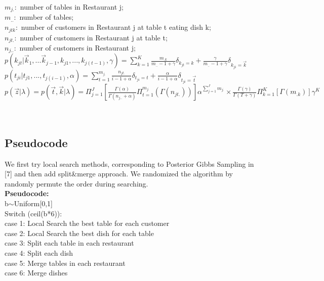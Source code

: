 \documentclass{article}
\begin{document}
$m_{j.}:$ number of tables in Restaurant j;\\
$m_{..}:$ number of tables;\\
$n_{jtk}:$ number of customers in Restaurant j at table t eating dish k;\\
$n_{jt.}:$ number of customers in Restaurant j at table t;\\
$n_{j..}:$ number of customers in Restaurant j;\\
$p(k_{jt}|\vec k_{1},...\vec k_{j-1},k_{j1},...,k_{j(t-1)},\gamma)=\sum_{k=1}^{K}\frac{m_{.k}}{m_{..}-1+\gamma}\delta_{k_{jt}=k}+\frac{\gamma}{m_{..}-1+\gamma}\delta_{k_{ji}=\vec k}$\\ 
$p(t_{ji}|t_{j1},...,t_{j(i-1)},\alpha)=\sum_{t=1}^{m_{j.}}\frac{n_{jt.}}{i-1+\alpha}\delta_{t_{ji}=t}+\frac{\alpha}{i-1+\alpha}\delta_{t_{ji}=\vec t}$\\ 
$p(\vec z|\lambda)=p(\vec t,\vec k|\lambda)=\Pi_{j=1}^{J}[\frac{\Gamma(\alpha)}{\Gamma(n_{j..}+\alpha)}\Pi_{t=1}^{m_{j.}}(\Gamma(n_{jt.}))]\alpha^{\sum_{j=1}^{J}m_{j.}}
\times \frac{\Gamma(\gamma)}{\Gamma(T+\gamma)}\Pi_{k=1}^{K} [\Gamma(m_{.k})] \gamma^{K}$ \\ \\ \\
\subsection{Pseudocode}
We first try local search methods, corresponding to Posterior Gibbs Sampling in [7] and then add split\&merge approach. We randomized the algorithm
by randomly permute the order during searching.\\

{\bf Pseudocode:}\\
b$\sim$Uniform[0,1]\\
Switch (ceil(b*6)):\\
case 1: Local Search the best table for each customer\\
case 2: Local Search the best dish for each table\\
case 3: Split each table in each restaurant\\
case 4: Split each dish\\
case 5: Merge tables in each restaurant\\ 
case 6: Merge dishes\\
\end{document}
